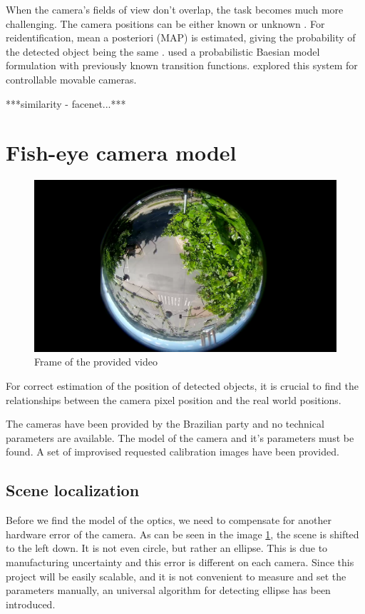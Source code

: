 \documentclass[a4paper,12pt,titlepage]{article}
\numberwithin{figure}{section}
\begin{document}
When the camera's fields of view don't overlap, the task becomes much more challenging. The camera positions can be either known \cite{rahimi2004simultaneous} or unknown \cite{makris2004bridging}. For reidentification, mean a posteriori (MAP) is estimated, giving the probability of the detected object being the same \cite{javed2005appearance, huang1997object}. \cite{kettnaker1999bayesian} used a probabilistic Baesian model formulation with previously known transition functions. \cite{kang2003continuous} explored this system for controllable movable cameras. 

***similarity - facenet...***



\section{Fish-eye camera model}
\label{sec:lens}

\begin{figure}[h]
\centering
\includegraphics[width=1\linewidth]{fig/stream1.png}
\caption{Frame of the provided video}
\label{fig:stream1}
\end{figure}

For correct estimation of the position of detected objects, it is crucial to find the relationships between the camera pixel position and the real world positions. 

The cameras have been provided by the Brazilian party and no technical parameters are available. The model of the camera and it's parameters must be found. A set of improvised requested calibration images have been provided.

\subsection{Scene localization}
\label{sec:scene_localization}
Before we find the model of the optics, we need to compensate for another hardware error of the camera. As can be seen in the image \ref{fig:stream1}, the scene is shifted to the left down. It is not even circle, but rather an ellipse. This is due to manufacturing uncertainty and this error is different on each camera. Since this project will be easily scalable, and it is not convenient to measure and set the parameters manually, an universal algorithm for detecting ellipse has been introduced.
\end{document}
